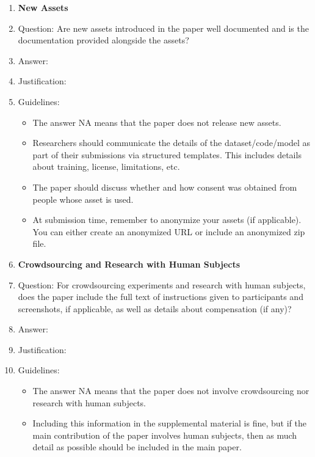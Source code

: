 \documentclass{article}
\begin{document}
\begin{enumerate}
\begin{itemize}
        \item For existing datasets that are re-packaged, both the original license and the license of the derived asset (if it has changed) should be provided.
        \item If this information is not available online, the authors are encouraged to reach out to the asset's creators.
    \end{itemize}
\item {\bf New Assets}
    \item[] Question: Are new assets introduced in the paper well documented and is the documentation provided alongside the assets?
    \item[] Answer: \answerNA{}
    \item[] Justification: \justificationTODO{}
    \item[] Guidelines:
    \begin{itemize}
        \item The answer NA means that the paper does not release new assets.
        \item Researchers should communicate the details of the dataset/code/model as part of their submissions via structured templates. This includes details about training, license, limitations, etc.
        \item The paper should discuss whether and how consent was obtained from people whose asset is used.
        \item At submission time, remember to anonymize your assets (if applicable). You can either create an anonymized URL or include an anonymized zip file.
    \end{itemize}
\item {\bf Crowdsourcing and Research with Human Subjects}
    \item[] Question: For crowdsourcing experiments and research with human subjects, does the paper include the full text of instructions given to participants and screenshots, if applicable, as well as details about compensation (if any)?
    \item[] Answer: \answerNA{}
    \item[] Justification: \justificationTODO{}
    \item[] Guidelines:
    \begin{itemize}
        \item The answer NA means that the paper does not involve crowdsourcing nor research with human subjects.
        \item Including this information in the supplemental material is fine, but if the main contribution of the paper involves human subjects, then as much detail as possible should be included in the main paper.

\end{itemize}
\end{enumerate}
\end{document}

